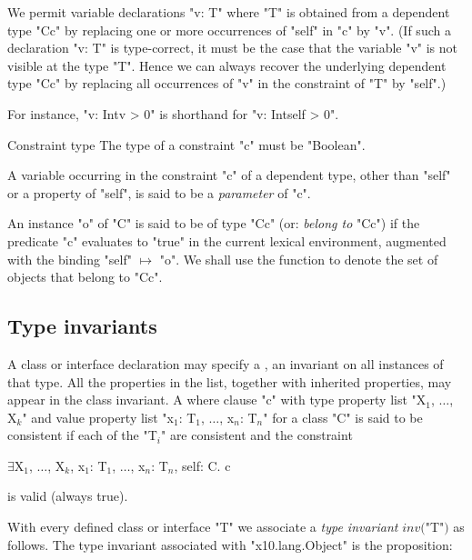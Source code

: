 We permit variable declarations \xcd"v: T" where \xcd"T" is obtained
from a dependent type \xcd"C{c}" by replacing one or more occurrences
of \xcd"self" in \xcd"c" by \xcd"v". (If such a declaration \xcd"v: T"
is type-correct, it must be the case that the variable \xcd"v" is not
visible at the type \xcd"T". Hence we can always recover the
underlying dependent type \xcd"C{c}" by replacing all occurrences of \xcd"v"
in the constraint of \xcd"T" by \xcd"self".)

For instance, \xcd"v: Int{v > 0}" is shorthand for \xcd"v: Int{self > 0}".

\begin{staticrule}{Constraint type}
The type of a constraint \xcd"c" must be \xcd"Boolean".  
\end{staticrule}

A variable occurring in the constraint \xcd"c" of a dependent type, other than
\xcd"self" or a property of \xcd"self", is said to be a {\em
parameter} of \xcd"c".\label{DepType:Parameter} 

An instance \xcd"o" of \xcd"C" is said to be of type \xcd"C{c}"
(or: {\em belong to}
\xcd"C{c}") if the predicate \xcd"c" evaluates to \xcd"true" in the current lexical
environment, augmented with the binding \xcd"self" $\mapsto$ \xcd"o". We shall
use the function  to denote the set of
objects that belong to \xcd"C{c}". 

\subsection{Type invariants}\label{DepType:TypeInvariant}
\label{DepType:Where}

A class or interface declaration may specify a
, an invariant on all
instances of that type.
All the properties in the list, together with inherited properties,
may appear in the class invariant. A where clause \xcd"c" with
type property list \xcdmath"X$_1$, $\dots$, X$_k$"
and value property list \xcdmath"x$_1$: T$_1$, $\dots$, x$_n$: T$_n$"
for a class \xcd"C" is said to be consistent if each of the \xcdmath"T$_i$" are
consistent and the constraint
\begin{xtenmath}
$\exists$X$_1$, $\dots$, X$_k$, x$_1$: T$_1$, $\dots$, x$_n$: T$_n$, self: C. c
\end{xtenmath}
\noindent is valid (always true).

With every defined class or interface \xcd"T" we associate a {\em type
invariant} $\mathit{inv}($\xcd"T"$)$ as follows. The type
invariant associated with \xcd"x10.lang.Object" is the
proposition:

